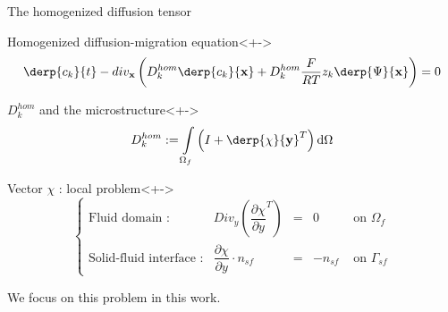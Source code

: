 \begin{frame}{The homogenized diffusion tensor}
%
\begin{block}{Homogenized diffusion-migration equation}<+->
\[\derp{c_k}{t}-div_{\mathbf{x}}\left(D_k^{hom}\derp{c_k}{\mathbf{x}}+D_k^{hom}\frac{F}{RT}z_k \derp{\Psi}{\mathbf{x}}\right)=0\]
\end{block}
%
\begin{block}{$D_k^{hom}$ and the microstructure}<+->%
\[D_k^{hom}:=\int\limits_{\Omega_f}\left(I+\derp{\chi}{\mathbf{y}}^T\right)\text{d}\Omega\]
\end{block}
%
\begin{block}{Vector $\chi$ : local problem}<+->
\vspace{-0.3cm}
\[%
\left\{%
\begin{array}{llccr}
\text{Fluid domain :}&Div_y \left( \dfrac{\partial{\chi}}{\partial{y}}^T\right) &=& 0&\text{ on }\Omega_f \\
\text{Solid-fluid interface :}&\dfrac{\partial{\chi}}{\partial{y}} \cdot n_{sf}&=&-n_{sf}&\text{ on }\Gamma_{sf}
\end{array}
\right.
\]

We focus on this problem in this work.
\end{block}
%
\end{frame}

